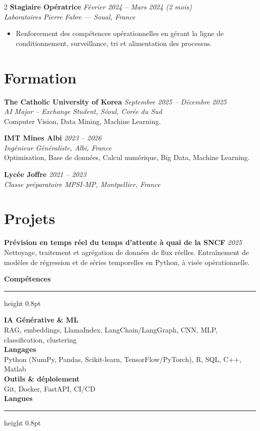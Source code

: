 \documentclass[10.5pt,a4paper]{article}
\newcommand{\sectionrule}{\vspace{-6pt}{\color{accent}\hrule height 1pt}\vspace{5pt}}
\newcommand{\subsectitle}[1]{%
  {\color{accent}\bfseries\large #1}\\[-2pt]
  {\color{accent}\hrule height 0.8pt}\vspace{5pt}
}
\newcommand{\cvexp}[5]{%
  \noindent\textbf{#1} \hfill {\itshape\color{graytext}\small #4}\\
  {\itshape #2 --- #3}\\[-2pt]
  #5
  \vspace{6pt}
}
\newcommand{\cvedu}[5]{%
  \noindent\textbf{#1} \hfill {\itshape\color{graytext}\small #4}\\
  {\itshape #2, #3}\\[1pt]
  {\small #5}
  \vspace{4pt}
}
\newcommand{\cveduplain}[4]{%
  \noindent\textbf{#1} \hfill {\itshape\color{graytext}\small #4}\\
  {\itshape #2, #3}
  \vspace{4pt}
}
\newcommand{\cvproject}[3]{%
  \noindent\textbf{#1} \hfill {\itshape\color{graytext}\small #2}\\[1pt]
  {\small #3}
  \vspace{3pt}
}
\newcommand{\sidebarline}[2]{%
  \noindent\textbf{\small #1}\\
  {\small #2}\\[3pt]
}
\begin{document}
\begin{paracol}{2}
\cvexp{Stagiaire Opératrice}{Laboratoires Pierre Fabre}{Soual, France}{Février 2024 -- Mars 2024 (2 mois)}{%
  \begin{itemize}[leftmargin=12pt, itemsep=2pt, topsep=0pt, partopsep=0pt, parsep=0pt]
    \item Renforcement des compétences opérationnelles en gérant la ligne de conditionnement, surveillance, tri et alimentation des processus.
  \end{itemize}
}

\section*{Formation}
\sectionrule

\cvedu{The Catholic University of Korea}{AI Major -- Exchange Student}{Séoul, Corée du Sud}{Septembre 2025 -- Décembre 2025}{Computer Vision, Data Mining, Machine Learning.}

\cvedu{IMT Mines Albi}{Ingénieur Généraliste}{Albi, France}{2023 -- 2026}{Optimisation, Base de données, Calcul numérique, Big Data, Machine Learning.}

\cveduplain{Lycée Joffre}{Classe préparatoire MPSI-MP}{Montpellier, France}{2021 -- 2023}

\section*{Projets}
\sectionrule

\cvproject{Prévision en temps réel du temps d'attente à quai de la SNCF}{2025}{Nettoyage, traitement et agrégation de données de flux réelles. Entraînement de modèles de régression et de séries temporelles en Python, à visée opérationnelle.}

\switchcolumn

\vspace{2pt}

\subsectitle{Compétences}

\sidebarline{IA Générative \& ML}{RAG, embeddings, LlamaIndex, LangChain/\allowbreak LangGraph, CNN, MLP, classification, clustering}
\sidebarline{Langages}{Python (NumPy, Pandas, Scikit-learn, TensorFlow/\allowbreak PyTorch), R, SQL, C++, Matlab}
\sidebarline{Outils \& déploiement}{Git, Docker, FastAPI, CI/CD}

\subsectitle{Langues}


\end{paracol}
\end{document}
